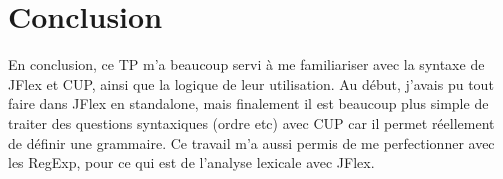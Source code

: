 \documentclass[a4paper]{article}
\begin{document}
\section{Conclusion}
En conclusion, ce TP m'a beaucoup servi à me familiariser avec la syntaxe de JFlex et CUP, ainsi que la logique de leur utilisation. Au début, j'avais pu tout faire dans JFlex en standalone, mais finalement il est beaucoup plus simple de traiter des questions syntaxiques (ordre etc) avec CUP car il permet réellement de définir une grammaire. Ce travail m'a aussi permis de me perfectionner avec les RegExp, pour ce qui est de l'analyse lexicale avec JFlex.
\end{document}
